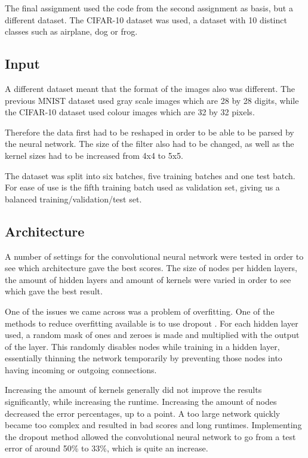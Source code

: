 
The final assignment used the code from the second assignment as basis, but a different dataset. The CIFAR-10 dataset was used, a dataset with 10 distinct classes such as airplane, dog or frog.

\subsection*{Input}
A different dataset meant that the format of the images also was different. The previous MNIST dataset used gray scale images which are 28 by 28 digits, while the CIFAR-10 dataset used colour images which are 32 by 32 pixels. 

Therefore the data first had to be reshaped in order to be able to be parsed by the neural network. The size of the filter also had to be changed, as well as the kernel sizes had to be increased from 4x4 to 5x5.

The dataset was split into six batches, five training batches and one test batch. For ease of use is the fifth training batch used as validation set, giving us a balanced training/validation/test set.

\subsection*{Architecture}
A number of settings for the convolutional neural network were tested in order to see which architecture gave the best scores. The size of nodes per hidden layers, the amount of hidden layers and amount of kernels were varied in order to see which gave the best result.

One of the issues we came across was a problem of overfitting. One of the methods to reduce overfitting available is to use dropout \cite{krizhevsky2012imagenet}\cite{srivastava2014dropout} .
 For each hidden layer used, a random mask of ones and zeroes is made and multiplied with the output of the layer. This randomly disables nodes while training in a hidden layer, essentially thinning the network temporarily by preventing those nodes into having incoming or outgoing connections.

Increasing the amount of kernels generally did not improve the results significantly, while increasing the runtime. Increasing the amount of nodes decreased the error percentages, up to a point. A too large network quickly became too complex and resulted in bad scores and long runtimes. Implementing the dropout method allowed the convolutional neural network to go from a test error of around 50\% to 33\%, which is quite an increase.


